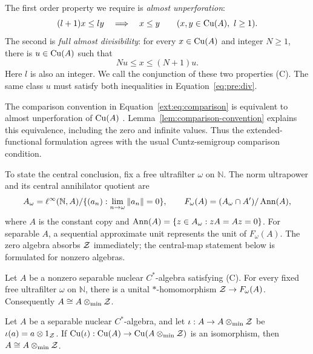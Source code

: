 The first order property we require is \emph{almost unperforation}:
\begin{equation}
 (l+1)x\le ly\quad\Longrightarrow\quad x\le y
 \qquad(x,y\in\mathrm{Cu}(A),\ l\ge1).
 \label{eq:pre:au}
\end{equation}
The second is \emph{full almost divisibility}: for every
$x\in\mathrm{Cu}(A)$ and integer $N\ge1$, there is $u\in\mathrm{Cu}(A)$ such that
\begin{equation}
 Nu\le x\le(N+1)u.
 \label{eq:pre:div}
\end{equation}
Here $l$ is also an integer. We call the conjunction of these two
properties \textup{(C)}. The same class $u$ must satisfy both
inequalities in Equation~\eqref{eq:pre:div}.

The comparison convention in Equation~\eqref{ext:eq:comparison} is
equivalent to almost unperforation of $\mathrm{Cu}(A)$
\cite[Proposition~6.2]{ERS2011}. Lemma~\ref{lem:comparison-convention}
explains this equivalence, including the zero and infinite values.
Thus the extended-functional formulation agrees with the usual
Cuntz-semigroup comparison condition.

To state the central conclusion, fix a free ultrafilter $\omega$ on
$\mathbb N$. The norm ultrapower and its central annihilator quotient
are
\[
 A_\omega=\ell^\infty(\mathbb N,A)/
       \{(a_n):\lim_{n\to\omega}\|a_n\|=0\},\qquad
 F_\omega(A)=(A_\omega\cap A')/\operatorname{Ann}(A),
\]
where $A$ is the constant copy and
$\operatorname{Ann}(A)=\{z\in A_\omega:zA=Az=0\}$. For separable $A$,
a sequential approximate unit represents the unit of $F_\omega(A)$.
The zero algebra absorbs $\mathcal Z$ immediately; the central-map statement
below is formulated for nonzero algebras.

\begin{theorem}
\label{thm:condition-C}
Let $A$ be a nonzero separable nuclear $C^*$-algebra satisfying
\textup{(C)}. For every fixed free ultrafilter $\omega$ on
$\mathbb N$, there is a unital $*$-homomorphism
$\mathcal Z\to F_\omega(A)$. Consequently $A\cong A\otimes_{\min}\mathcal Z$.
\end{theorem}

\begin{corollary}
\label{cor:canonical}
Let $A$ be a separable nuclear $C^*$-algebra, and let
$\iota:A\to A\otimes_{\min}\mathcal Z$ be $\iota(a)=a\otimes1_\mathcal Z$.
If $\mathrm{Cu}(\iota):\mathrm{Cu}(A)\to\mathrm{Cu}(A\otimes_{\min}\mathcal Z)$ is an
isomorphism, then $A\cong A\otimes_{\min}\mathcal Z$.
\end{corollary}

